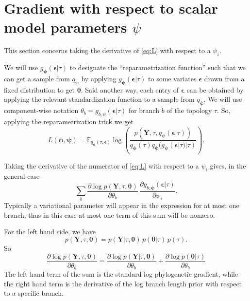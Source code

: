\documentclass{article}
\begin{document}
\section*{Gradient with respect to scalar model parameters $\psi$}

This section concerns taking the derivative of \eqref{eq:L} with respect to a $\psi_i$.

We will use $g_{\bm{\psi}}(\bm{\epsilon}|\tau)$ to designate the ``reparametrization function'' such that we can get a sample from $q_{\bm\psi}$ by applying $g_{\bm{\psi}}(\bm{\epsilon}|\tau)$ to some variates $\bm\epsilon$ drawn from a fixed distribution to get $\bm\theta$.
Said another way, each entry of $\bm{\epsilon}$ can be obtained by applying the relevant standardization function to a sample from $q_{\bm\psi}$.
We will use component-wise notation $\theta_b = g_{b, \psi}(\bm\epsilon|\tau)$ for branch $b$ of the topology $\tau$.
So, applying the reparametrization trick we get
\begin{equation}
L(\bm{\phi},{\bm{\psi}}) = \mathbb{E}_{
    q_{\bm{\phi}}(\tau,\bm{\epsilon})}
    \log\left(
        \frac
        {p(\bm{Y},\tau,g_{\bm{\psi}}(\bm{\epsilon}|\tau))}
        {q_{\bm{\phi}}(\tau)q_{\bm{\psi}}(g_{\bm{\psi}}(\bm{\epsilon}|\tau)|\tau)}
    \right).
\label{eq:L}
\end{equation}

Taking the derivative of the numerator of \eqref{eq:L} with respect to a $\psi_i$ gives, in the general case
\begin{equation}
    \sum_b
    \frac{\partial \log p(\bm{Y} , \tau, \bm\theta)}{\partial \theta_b} \,
    \frac{\partial g_{b,\bm\psi}(\bm\epsilon | \tau)}{\partial \psi_i}.
    \label{eq:dlogpdPsi}
\end{equation}
Typically a variational parameter will appear in the expression for at most one branch, thus in this case at most one term of this sum will be nonzero.

For the left hand side, we have
\[
p(\bm{Y},\tau,\bm\theta) =
p(\bm{Y}|\tau,\bm\theta) \, p(\bm\theta | \tau) \, p(\tau).
\]
So
\begin{equation*}
\frac{\partial \log p(\bm{Y}, \tau, \bm\theta)}{\partial \theta_b} =
\frac{\partial \log p(\bm{Y} | \tau, \bm\theta)}{\partial \theta_b}
+
\frac{\partial \log p(\bm\theta | \tau)}{\partial \theta_b}
\end{equation*}
The left hand term of the sum is the standard log phylogenetic gradient, while the right hand term is the derivative of the log branch length prior with respect to a specific branch.
\end{document}
